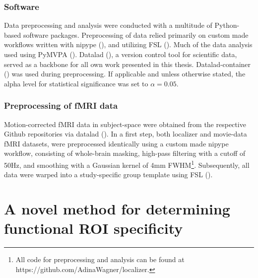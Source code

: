 \documentclass[a4paper, 12pt]{scrreprt}
\begin{document}
\subsection{Software}
Data preprocessing and analysis were conducted with a multitude of Python-based software packages. Preprocessing of data relied primarily on custom made workflows written with nipype (\cite{gorgolewski_krzysztof}), and utilizing FSL (\cite{jenkinson2012fsl}). Much of the data analysis used using PyMVPA (\cite{hanke2009pymvpa}). Datalad (\cite{visconti_di_oleggio_castello_matteo_2019_2560733}), a version control tool for scientific data, served as a backbone for all own work presented in this thesis. Datalad-container (\cite{michael_hanke_2018_2431915}) was used during preprocessing. If applicable and unless otherwise stated, the alpha level for statistical significance was set to $\alpha = 0.05$.

\subsection{Preprocessing of fMRI data}

Motion-corrected fMRI data in subject-space were obtained from the respective Github repositories via datalad (\cite{visconti_di_oleggio_castello_matteo_2019_2560733}). In a first step, both localizer and movie-data fMRI datasets, were preprocessed identically using a custom made nipype workflow, consisting of whole-brain masking, high-pass filtering with a cutoff of 50Hz, and smoothing with a Gaussian kernel of 4mm FWHM\footnote{All code for preprocessing and analysis can be found at https://github.com/AdinaWagner/localizer.}. Subsequently, all data were warped into a study-specific group template using FSL (\cite{jenkinson2012fsl}). 




\chapter{A novel method for determining functional ROI specificity}\label{c1}
\end{document}
